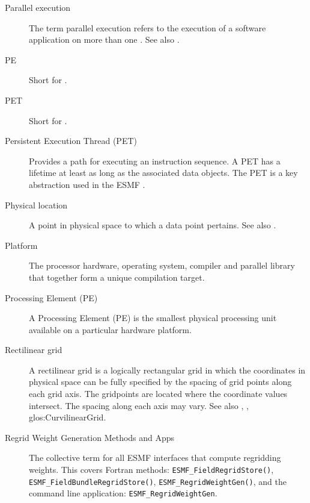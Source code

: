 \begin{description}
\label{glos:Parallel}
\item[Parallel execution]
  The term parallel execution refers to the execution of a software
  application on more than one .
  See also .

\label{glos:PE} 
\item[PE] 
  Short for .

\label{glos:PET} 
\item[PET] 
  Short for .

\label{glos:PermET} 
\item[Persistent Execution Thread (PET)] 
  Provides a
  path for executing an instruction sequence. A PET has a lifetime at least 
  as long as the associated data objects. The PET is a key abstraction 
  used in the ESMF .

\label{glos:PhysLoc} 
\item[Physical location] 
  A point in physical space to which a data point pertains.  See also
  .   

\label{glos:Platform} 
\item[Platform] 
  The processor hardware, operating system, compiler and
  parallel library that together form a unique compilation target.

\label{glos:Processing_Element}
\item[Processing Element (PE)] 
  A Processing Element (PE) is the smallest physical processing unit available
  on a particular hardware platform.

\label{glos:RectilinearGrid}
\item[Rectilinear grid]
  A rectilinear grid is a logically rectangular grid in which 
  the coordinates in physical space can be fully specified by
  the spacing of grid points along each grid axis.  The
  gridpoints are located where the coordinate values intersect.
  The spacing along each axis may vary.  
  See also ,
  , 
  {glos:CurvilinearGrid}.  

\label{glos:RegridWeightGenerationMethodsAndApps}
\item[Regrid Weight Generation Methods and Apps] 
  The collective term for all ESMF interfaces that compute regridding weights. 
  This covers Fortran methods: 
  {\tt ESMF\_FieldRegridStore()},
  {\tt ESMF\_FieldBundleRegridStore()},
  {\tt ESMF\_RegridWeightGen()},
  and the command line application: {\tt ESMF\_RegridWeightGen}.


\end{description}
